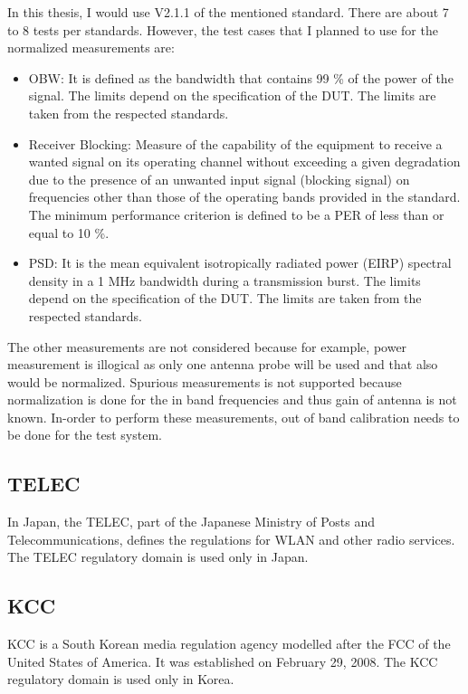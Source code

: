 In this thesis, I would use V2.1.1 of the mentioned standard. There are about 7 to 8 tests per standards. However, the test cases that I planned to use for the normalized measurements are:
\begin{itemize}
\item \acf{OBW}: It is defined as the bandwidth that contains 99 \% of the power of the signal. The limits depend on the specification of the \acs{DUT}. The limits are taken from the respected standards.
\item Receiver Blocking:  Measure of the capability of the equipment to receive a wanted signal on its operating channel without exceeding a given degradation due to the presence of an unwanted input signal (blocking signal) on frequencies other than those of the operating bands provided in the standard. The minimum performance criterion is defined to be a \acf{PER} of less than or equal to 10 \%.
\item \acf{PSD}: It is the mean equivalent isotropically radiated power (\acs{EIRP}) spectral density in a 1 MHz bandwidth during a transmission burst. The limits depend on the specification of the \acs{DUT}. The limits are taken from the respected standards.
\end{itemize}
The other measurements are not considered because for example, power measurement is illogical as only one antenna probe will be used and that also would be normalized. Spurious measurements is not supported because normalization is done for the in band frequencies and thus gain of antenna is not known. In-order to perform these measurements, out of band calibration needs to be done for the test system. 


\subsection{\acf{TELEC}}
In Japan, the \acf{TELEC}, part of the Japanese Ministry of Posts and Telecommunications, defines the regulations for \acs{WLAN} and other radio services. The \acs{TELEC} regulatory domain is used only in Japan.


\subsection{\acf{KCC}}
\acs{KCC} is a South Korean media regulation agency modelled after the \acf{FCC} of the United States of America. It was established on February 29, 2008. The \acs{KCC} regulatory domain is used only in Korea.
 


